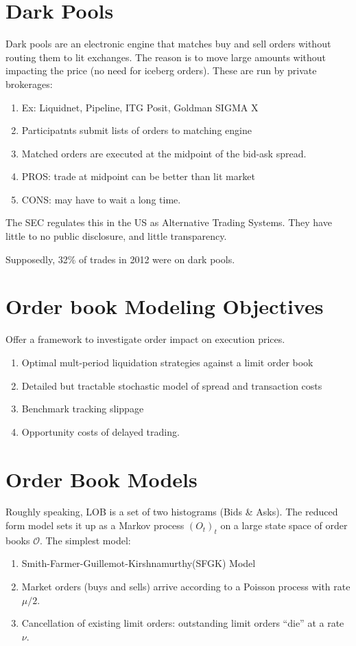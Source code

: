 \documentclass[twocolumn,openany]{book}
\begin{document}
\section{Dark Pools}
Dark pools are an electronic engine that matches buy and sell orders without routing them to lit exchanges.
The reason is to move large amounts without impacting the price (no need for iceberg orders).
These are run by private brokerages:
\begin{enumerate}
	\item Ex: Liquidnet, Pipeline, ITG Posit, Goldman SIGMA X
	\item Participatnts submit lists of orders to matching engine
	\item Matched orders are executed at the midpoint of the bid-ask spread.
	\item PROS: trade at midpoint can be better than lit market
	\item CONS: may have to wait a long time.
\end{enumerate}
The SEC regulates this in the US as Alternative Trading Systems.
They have little to no public disclosure, and little transparency.

Supposedly, 32\% of trades in 2012 were on dark pools.


\section{Order book Modeling Objectives}
Offer a framework to investigate order impact on execution prices.
\begin{enumerate}
	\item Optimal mult-period liquidation strategies against a limit order book
	\item Detailed but tractable stochastic model of spread and transaction costs
	\item Benchmark tracking slippage
	\item Opportunity costs of delayed trading.
\end{enumerate}

\section{Order Book Models}
Roughly speaking, LOB is a set of two histograms (Bids \& Asks). The reduced form model sets it up as a Markov process $(O_t)_t$ on a large state space of order books $\mathcal{O}$. The simplest model:
\begin{enumerate}
	\item Smith-Farmer-Guillemot-Kirshnamurthy(SFGK) Model
	\item Market orders (buys and sells) arrive according to a Poisson process with rate $\mu/2$.
	\item Cancellation of existing limit orders: outstanding limit orders ``die'' at a rate $\nu$.
\end{enumerate}
\end{document}
